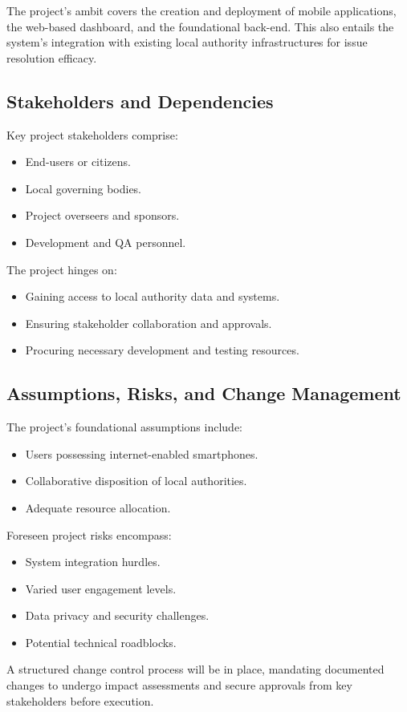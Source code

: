     The project's ambit covers the creation and deployment of mobile applications, the \gls{web-based} dashboard, and the foundational back-end. This also entails the system's integration with existing local authority infrastructures for issue resolution efficacy.
    
\subsection{Stakeholders and Dependencies}
    Key project stakeholders comprise:
    \begin{itemize}
        \item End-users or citizens.
        \item Local governing bodies.
        \item Project overseers and sponsors.
        \item Development and \gls{QA} personnel.
    \end{itemize}
    
    The project hinges on:
    \begin{itemize}
        \item Gaining access to local authority data and systems.
        \item Ensuring stakeholder collaboration and approvals.
        \item Procuring necessary development and testing resources.
    \end{itemize}

\subsection{Assumptions, Risks, and Change Management}
    The project's foundational assumptions include:
    \begin{itemize}
        \item Users possessing internet-enabled smartphones.
        \item Collaborative disposition of local authorities.
        \item Adequate resource allocation.
    \end{itemize}

    Foreseen project risks encompass:
    \begin{itemize}
        \item System integration hurdles.
        \item Varied user engagement levels.
        \item Data privacy and security challenges.
        \item Potential technical roadblocks.
    \end{itemize}
    
    A structured change control process will be in place, mandating documented changes to undergo impact assessments and secure approvals from key stakeholders before execution.
